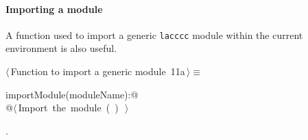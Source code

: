 \documentclass[11pt,oneside]{article}	%
\begin{document}
\paragraph{Importing a module} A function used to import a generic \texttt{lacccc} module within the current environment is also useful.
\begin{flushleft} \small
\begin{minipage}{\linewidth} \label{scrap21}
\protect{}$\langle\,$Function to import a generic module\nobreak\ {\footnotesize 11a}$\,\rangle\equiv$
\vspace{-1ex}
\begin{list}{}{} \item
\mbox{}\verb@def importModule(moduleName):@\\
\mbox{}\verb@   @\hbox{$\langle\,$Import the module\nobreak\ ({\footnotesize {}\label{scrap22}
 }\mbox{}\verb@moduleName@ ) {\footnotesize {}}$\,\rangle$}\verb@@\\
\mbox{}\verb@@{\NWsep}
\end{list}
\vspace{-1ex}
\footnotesize\addtolength{\baselineskip}{-1ex}
\begin{list}{}{\setlength{\itemsep}{-\parsep}\setlength{\itemindent}{-\leftmargin}}
\item {\NWtxtMacroNoRef}.
\end{list}
\end{minipage}\\[4ex]
\end{flushleft}




\end{document}
